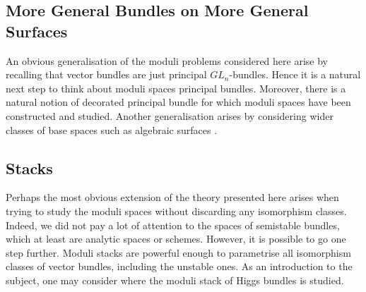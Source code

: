 \documentclass[12pt]{ociamthesis}  %
\begin{document}
\subsection{More General Bundles on More General Surfaces}

An obvious generalisation of the moduli problems considered here
arise by recalling that vector bundles are just principal
$GL_n$-bundles. Hence it is a natural next step to think about
moduli spaces principal bundles. Moreover, there is a natural
notion of decorated principal bundle for which moduli spaces have
been constructed and studied. \missingcitation
Another generalisation arises by considering wider classes
of base spaces such as algebraic surfaces \missingcitation.

\subsection{Stacks}

Perhaps the most obvious extension of the theory presented here
arises when trying to study the moduli spaces without discarding
any isomorphism classes. Indeed, we did not pay a lot
of attention to the spaces of semistable bundles, which at least
are analytic spaces or schemes. However, it is possible to go one
step further. Moduli stacks are powerful enough to parametrise
all isomorphism classes of vector bundles, including the unstable ones.
As an introduction to the subject, one may consider
\cite{cm2017} where the moduli stack of Higgs bundles is studied.

\pagebreak
\renewcommand{\bibname}{References}
\printbibliography
\end{document}
